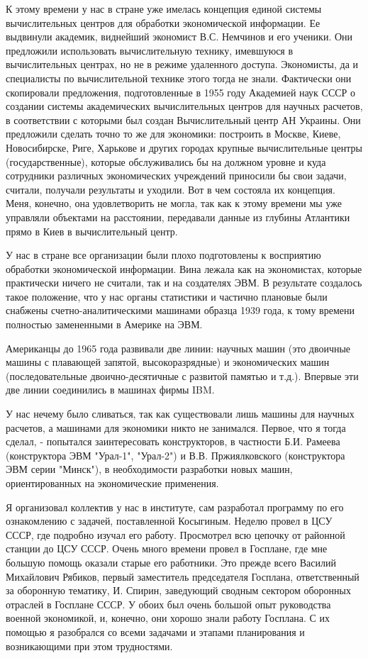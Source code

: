 К этому времени у нас в стране уже имелась концепция единой системы
вычислительных центров для обработки экономической информации. Ее выдвинули
академик, виднейший экономист В.С. Немчинов и его ученики. Они предложили
использовать вычислительную технику, имевшуюся в вычислительных центрах, но не в
режиме удаленного доступа. Экономисты, да и специалисты по вычислительной
технике этого тогда не знали. Фактически они скопировали предложения,
подготовленные в 1955 году Академией наук СССР о создании системы академических
вычислительных центров для научных расчетов, в соответствии с которыми был
создан Вычислительный центр АН Украины. Они предложили сделать точно то же для
экономики: построить в Москве, Киеве, Новосибирске, Риге, Харькове и других
городах крупные вычислительные центры (государственные), которые обслуживались
бы на должном уровне и куда сотрудники различных экономических учреждений
приносили бы свои задачи, считали, получали результаты и уходили. Вот в чем
состояла их концепция. Меня, конечно, она удовлетворить не могла, так как к
этому времени мы уже управляли объектами на расстоянии, передавали данные из
глубины Атлантики прямо в Киев в вычислительный центр.

У нас в стране все организации были плохо подготовлены к восприятию обработки
экономической информации. Вина лежала как на экономистах, которые практически
ничего не считали, так и на создателях ЭВМ. В результате создалось такое
положение, что у нас органы статистики и частично плановые были снабжены
счетно-аналитическими машинами образца 1939 года, к тому времени полностью
замененными в Америке на ЭВМ.

Американцы до 1965 года развивали две линии: научных машин (это двоичные машины
с плавающей запятой, высокоразрядные) и экономических машин (последовательные
двоично-десятичные с развитой памятью и т.д.). Впервые эти две линии соединились
в машинах фирмы IBM.

У нас нечему было сливаться, так как существовали лишь машины для научных
расчетов, а машинами для экономики никто не занимался. Первое, что я тогда
сделал, - попытался заинтересовать конструкторов, в частности Б.И. Рамеева
(конструктора ЭВМ "Урал-1", "Урал-2") и В.В. Пржиялковского (конструктора ЭВМ
серии "Минск"), в необходимости разработки новых машин, ориентированных на
экономические применения.

Я организовал коллектив у нас в институте, сам разработал программу по его
ознакомлению с задачей, поставленной Косыгиным. Неделю провел в ЦСУ СССР, где
подробно изучал его работу. Просмотрел всю цепочку от районной станции до ЦСУ
СССР. Очень много времени провел в Госплане, где мне большую помощь оказали
старые его работники. Это прежде всего Василий Михайлович Рябиков, первый
заместитель председателя Госплана, ответственный за оборонную тематику, И.
Спирин, заведующий сводным сектором оборонных отраслей в Госплане СССР. У обоих
был очень большой опыт руководства военной экономикой, и, конечно, они хорошо
знали работу Госплана. С их помощью я разобрался со всеми задачами и этапами
планирования и возникающими при этом трудностями.

